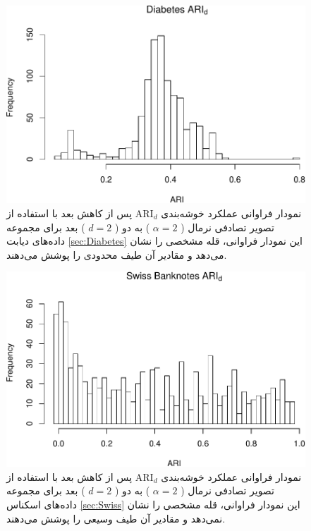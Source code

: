 \begin{figure}[H]
\centering
\includegraphics[width=0.7\linewidth]{Report_files/figure-latex/unnamed-chunk-3-3}
\caption{
نمودار فراوانی عملکرد خوشه‌بندی 
$\mathrm{ARI}_d$
پس از کاهش بعد با استفاده از تصویر تصادفی
نرمال (%
$\alpha=2$%
)
به دو (%
$d=2$%
)
بعد برای مجموعه داده‌های
دیابت
\ref{sec:Diabetes}
این نمودار فراوانی،
قله
مشخصی را نشان 
می‌دهد
و مقادیر آن طیف 
محدودی
را پوشش می‌دهند.
}
\end{figure}



\begin{figure}[H]
\centering
\includegraphics[width=0.7\linewidth]{Report_files/figure-latex/unnamed-chunk-3-4}
\caption{
نمودار فراوانی عملکرد خوشه‌بندی 
$\mathrm{ARI}_d$
پس از کاهش بعد با استفاده از تصویر تصادفی
نرمال (%
$\alpha=2$%
)
به دو (%
$d=2$%
)
بعد برای مجموعه داده‌های
اسکناس
\ref{sec:Swiss}
این نمودار فراوانی،
قله
مشخصی را نشان 
نمی‌دهد
و مقادیر آن طیف 
وسیعی را پوشش می‌دهند.
}
\end{figure}

